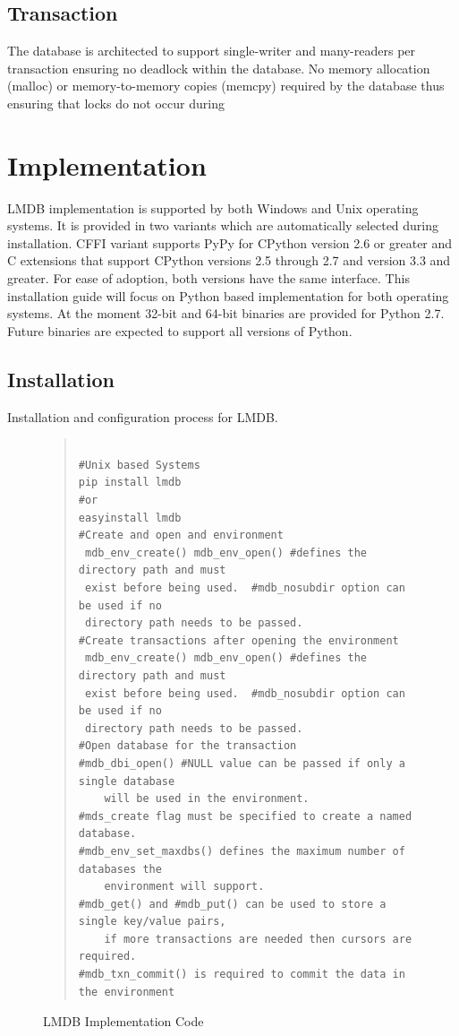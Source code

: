 \documentclass[9pt,twocolumn,twoside]{../../styles/osajnl}
\begin{document}
\subsection{Transaction}

The database is architected to support single-writer and many-readers
per transaction \cite{www-lmdbdoc} ensuring no deadlock within the
database. No memory allocation (malloc) or memory-to-memory copies
(memcpy) required by the database thus ensuring that locks do not
occur during

\section{Implementation}

LMDB implementation is supported by both Windows and Unix operating
systems. It is provided in two variants which are automatically
selected during installation. CFFI variant supports PyPy for CPython
version 2.6 or greater and C extensions that support CPython versions
2.5 through 2.7 and version 3.3 and greater. For ease of adoption,
both versions have the same interface. This installation guide will
focus on Python based implementation for both operating systems.  At
the moment 32-bit and 64-bit binaries are provided for Python
2.7. Future binaries are expected to support all versions of Python.

\subsection{Installation}

Installation and configuration process for LMDB.

\begin{figure}[htb]
\begin{quote}
\begin{Verbatim}

#Unix based Systems
pip install lmdb
#or
easyinstall lmdb
#Create and open and environment   
 mdb_env_create() mdb_env_open() #defines the directory path and must
 exist before being used.  #mdb_nosubdir option can be used if no
 directory path needs to be passed. 
#Create transactions after opening the environment
 mdb_env_create() mdb_env_open() #defines the directory path and must
 exist before being used.  #mdb_nosubdir option can be used if no
 directory path needs to be passed. 
#Open database for the transaction
#mdb_dbi_open() #NULL value can be passed if only a single database
    will be used in the environment. 
#mds_create flag must be specified to create a named database. 
#mdb_env_set_maxdbs() defines the maximum number of databases the
    environment will support.
#mdb_get() and #mdb_put() can be used to store a single key/value pairs,
    if more transactions are needed then cursors are required. 
#mdb_txn_commit() is required to commit the data in the environment

\end{Verbatim}
\end{quote}
\caption{LMDB Implementation Code}\label{alg:python}
\end{figure}
\end{document}
